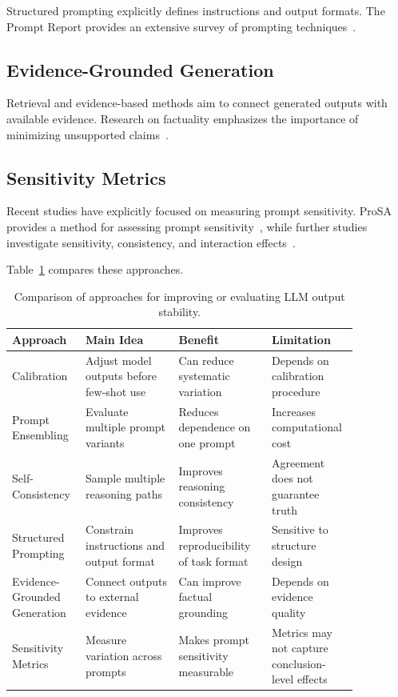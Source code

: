 \documentclass[acmsmall,screen,review]{acmart}
\begin{document}
Structured prompting explicitly defines instructions and output formats. The Prompt Report provides an extensive survey of prompting techniques~\cite{schulhoff2024}.

\subsection{Evidence-Grounded Generation}

Retrieval and evidence-based methods aim to connect generated outputs with available evidence. Research on factuality emphasizes the importance of minimizing unsupported claims~\cite{lee2022,lin2022}.

\subsection{Sensitivity Metrics}

Recent studies have explicitly focused on measuring prompt sensitivity. ProSA provides a method for assessing prompt sensitivity~\cite{zhuo2024}, while further studies investigate sensitivity, consistency, and interaction effects~\cite{errica2025,qin2026}.

Table~\ref{tab:approach-comparison} compares these approaches.

\begin{table}[t]
\caption{Comparison of approaches for improving or evaluating LLM output stability.}
\label{tab:approach-comparison}
\centering
\begin{tabular}{p{0.16\linewidth}p{0.25\linewidth}p{0.25\linewidth}p{0.20\linewidth}}
\toprule
Approach & Main Idea & Benefit & Limitation \\
\midrule
Calibration & Adjust model outputs before few-shot use & Can reduce systematic variation & Depends on calibration procedure \\
Prompt Ensembling & Evaluate multiple prompt variants & Reduces dependence on one prompt & Increases computational cost \\
Self-Consistency & Sample multiple reasoning paths & Improves reasoning consistency & Agreement does not guarantee truth \\
Structured Prompting & Constrain instructions and output format & Improves reproducibility of task format & Sensitive to structure design \\
Evidence-Grounded Generation & Connect outputs to external evidence & Can improve factual grounding & Depends on evidence quality \\
Sensitivity Metrics & Measure variation across prompts & Makes prompt sensitivity measurable & Metrics may not capture conclusion-level effects \\
\bottomrule
\end{tabular}
\end{table}
\end{document}
